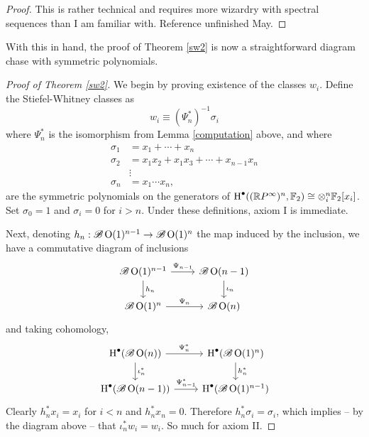 \documentclass{amsart}
\begin{document}
\begin{proof}
    This is rather technical and requires more wizardry with spectral sequences than I am familiar with. 
    Reference {\color{magenta}unfinished May}.
\end{proof}
With this in hand, the proof of Theorem \ref{sw2} is now a straightforward diagram chase
with symmetric polynomials.
\begin{proof}[Proof of Theorem \ref{sw2}]
    We begin by proving existence of the classes $w_i$.
    Define the Stiefel-Whitney classes as
    \begin{equation*}
        w_i \equiv (\Psi_n^*)^{-1}\sigma_i
    \end{equation*}
    where $\Psi_n^*$ is the isomorphism from Lemma \ref{computation} above, and where
    \begin{align*}
        \sigma_1 &= x_1+\cdots+x_n\\
        \sigma_2 &= x_1x_2+x_1x_3+\cdots+x_{n-1}x_n\\
        &\vdots\\
        \sigma_n &= x_1\cdots x_n,
    \end{align*}
    are the symmetric polynomials on the generators of
    $\operatorname{H}^\bullet( (\mathbb{R} P^\infty)^n,\mathbb{F}_2)\cong\otimes_i^n\mathbb{F}_2[x_i]$.
    Set $\sigma_0=1$ and $\sigma_i=0$ for $i>n$. Under these definitions, axiom I is immediate.

    Next, denoting $h_n:\mathscr{B}\operatorname{O}(1)^{n-1}\to\mathscr{B}\operatorname{O}(1)^n$ the map induced by
    the inclusion, we have a commutative diagram of inclusions
    \begin{equation*}
        \begin{tikzcd}
            \mathscr{B}\OO(1)^{n-1}\ar{r}{\Psi_{n-1}}\ar{d}{h_n} & \mathscr{B}\OO(n-1)\ar{d}{\iota_n}\\
            \mathscr{B}\OO(1)^n\ar{r}{\Psi_n} & \mathscr{B}\OO(n)
        \end{tikzcd}
    \end{equation*}
    and taking cohomology,
    \begin{equation*}
        \begin{tikzcd}
            \HH^\bullet(\mathscr{B}\OO(n))\ar{r}{\Psi_n^*}\ar{d}{\iota_n^*} & \HH^\bullet(\mathscr{B}\OO(1)^n)\ar{d}{h_n^*}\\
            \HH^\bullet(\mathscr{B}\OO(n-1))\ar{r}{\Psi_{n-1}^*} & \HH^\bullet(\mathscr{B}\OO(1)^{n-1})
        \end{tikzcd}
    \end{equation*}
    Clearly $h_n^*x_i=x_i$ for $i<n$ and $h_n^*x_n=0$. Therefore $h_n^*\sigma_i=\sigma_i$, which implies
    -- by the diagram above -- that $\iota_n^*w_i=w_i$. So much for axiom II.


\end{proof}
\end{document}

